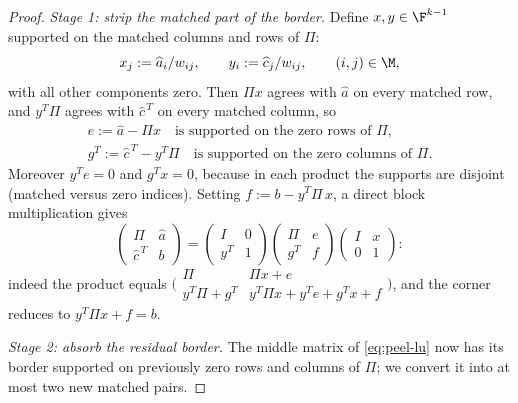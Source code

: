 \begin{proof}
  \emph{Stage 1: strip the matched part of the border.}
  Define $x, y \in \F^{k-1}$ supported on the matched columns and rows of
  $\Pi$:
  \[
    x_j := \widehat a_i / w_{ij},
    \qquad
    y_i := \widehat c_j / w_{ij},
    \qquad (i,j) \in \M,
  \]
  with all other components zero.  Then $\Pi x$ agrees with $\widehat a$ on
  every matched row, and $y^T \Pi$ agrees with $\widehat c^{\,T}$ on every
  matched column, so
  \begin{gather*}
    e := \widehat a - \Pi x
    \quad \text{is supported on the zero rows of } \Pi,\\
    g^T := \widehat c^{\,T} - y^T \Pi
    \quad \text{is supported on the zero columns of } \Pi .
  \end{gather*}
  Moreover $y^T e = 0$ and $g^T x = 0$, because in each product the supports
  are disjoint (matched versus zero indices).  Setting
  $f := b - y^T \Pi \, x$, a direct block multiplication gives
  \begin{equation}\label{eq:peel-lu}
    \begin{pmatrix}
      \Pi & \widehat a\\
      \widehat c^{\,T} & b
    \end{pmatrix}
    =
    \begin{pmatrix}
      I & 0\\
      y^T & 1
    \end{pmatrix}
    \begin{pmatrix}
      \Pi & e\\
      g^T & f
    \end{pmatrix}
    \begin{pmatrix}
      I & x\\
      0 & 1
    \end{pmatrix}:
  \end{equation}
  indeed the product equals
  $\bigl(\begin{smallmatrix} \Pi & \Pi x + e\\ y^T \Pi + g^T & y^T \Pi x +
  y^T e + g^T x + f \end{smallmatrix}\bigr)$, and the corner reduces to
  $y^T \Pi x + f = b$.

  \emph{Stage 2: absorb the residual border.}
  The middle matrix of \cref{eq:peel-lu} now has its border supported on
  previously zero rows and columns of $\Pi$; we convert it into at most two
  new matched pairs.


\end{proof}
